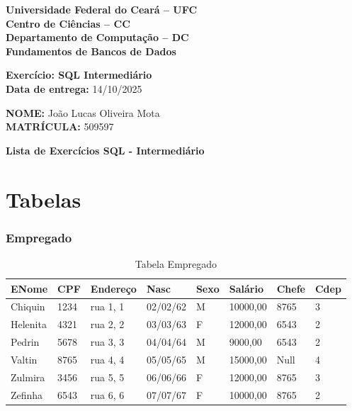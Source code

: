 \documentclass[a4paper,12pt]{article}
\begin{document}
\begin{center}
    \textbf{Universidade Federal do Ceará – UFC}\\
    \textbf{Centro de Ciências – CC}\\
    \textbf{Departamento de Computação – DC}\\
    \textbf{Fundamentos de Bancos de Dados}
\end{center}
\vspace{0.5cm}

\noindent
\textbf{Exercício: SQL Intermediário}\\
\textbf{Data de entrega:} 14/10/2025

\vspace{0.7cm}

\noindent
\textbf{NOME:} João Lucas Oliveira Mota\\
\textbf{MATRÍCULA:} 509597

\vspace{1cm}
\newpage
\begin{center}
    \Large\textbf{Lista de Exercícios SQL - Intermediário}
\end{center}

\vspace{0.5cm}

\section*{Tabelas}

\subsubsection*{Empregado}
\begin{table}[h]
\centering
\caption{Tabela Empregado}
\begin{tabular}{|l|l|l|l|l|l|l|l|}
\hline
\textbf{ENome}   & \textbf{CPF} & \textbf{Endereço} & \textbf{Nasc}   & \textbf{Sexo} & \textbf{Salário} & \textbf{Chefe} & \textbf{Cdep} \\ \hline
Chiquin          & 1234         & rua 1, 1          & 02/02/62        & M             & 10000,00       & 8765          & 3            \\ \hline
Helenita         & 4321         & rua 2, 2          & 03/03/63        & F             & 12000,00       & 6543          & 2            \\ \hline
Pedrin           & 5678         & rua 3, 3          & 04/04/64        & M             & 9000,00        & 6543          & 2            \\ \hline
Valtin           & 8765         & rua 4, 4          & 05/05/65        & M             & 15000,00       & Null          & 4            \\ \hline
Zulmira          & 3456         & rua 5, 5          & 06/06/66        & F             & 12000,00       & 8765          & 3            \\ \hline
Zefinha          & 6543         & rua 6, 6          & 07/07/67        & F             & 10000,00       & 8765          & 2            \\ \hline
\end{tabular}
\end{table}
\end{document}
